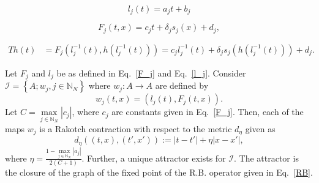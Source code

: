 \documentclass[10pt,a4paper]{amsart}
\begin{document}
\begin{equation}
l_j(t)=a_jt+b_j  \label{l_j}
\end{equation}

\begin{equation}
F_j(t,x)=c_jt+\delta_js_j(x)+d_j, \label{F_j}
\end{equation}

\begin{eqnarray}
Th(t)&=F_j(l_j^{-1}(t),h(l_j^{-1}(t))) = c_jl_j^{-1}(t)+\delta_js_j(h(l_j^{-1}(t)))+d_j\label{RB}.
\end{eqnarray}

\begin{theorem}\label{graphoffp}
Let $F_j$ and $l_j$ be as defined in Eq.~\eqref{F_j} and Eq.~\eqref{l_j}. Consider~
\\$\mathcal{I}=\left\{ A; w_j, j\in\mathbb N_N\right\}$ where  $w_j: A\rightarrow A $ are defined by 
\begin{equation}
w_j(t,x)=(l_j(t),F_j(t,x)).             \label{wi}
\end{equation}
Let $C=\max\limits_{j\in\mathbb N_N}|c_j|$, where $c_j$ are constants given in Eq.~\eqref{F_j}. Then, each of the maps $w_j$ is a Rakotch contraction with respect to the metric $d_{\eta}$ given as
\begin{equation*}
d_{\eta}((t,x),(t',x')):=|t-t'|+\eta|x-x'|,
\end{equation*}
where $\eta=\frac{1-\max\limits_{j\in \mathbb N_N}|a_j|}{2(C+1)}$.
Further, a unique attractor exists for $\mathcal{I}$. The attractor is the closure of the graph of the fixed point of the R.B. operator given in Eq.~\eqref{RB}.
\end{theorem}
\end{document}
